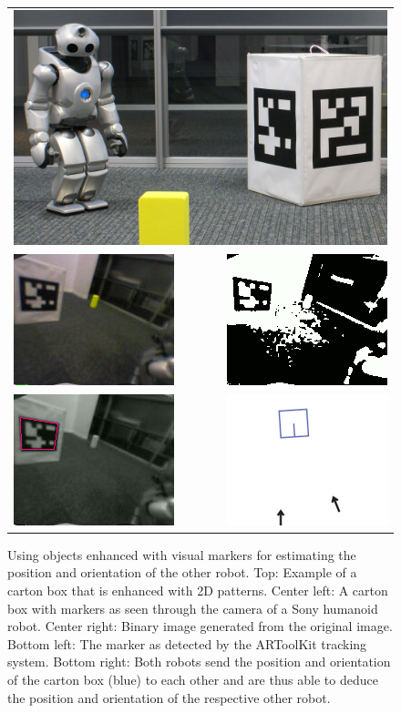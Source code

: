 \begin{figure}[t]
  \begin{tabular}{lr}
    \multicolumn{2}{l}{
      \includegraphics[width=0.5\columnwidth]{figures/artoolkit-0}\vspace{2mm}} \\
    \includegraphics[width=0.23\columnwidth]{figures/artoolkit-1} & 
    \includegraphics[width=0.23\columnwidth]{figures/artoolkit-2}\vspace{2mm}\\
    \includegraphics[width=0.23\columnwidth]{figures/artoolkit-3} & 
    \includegraphics[width=0.23\columnwidth]{figures/artoolkit-4}\\
  \end{tabular}
  \caption{Using objects enhanced with visual markers for estimating
    the position and orientation of the other robot. Top: Example of a
    carton box that is enhanced with 2D patterns. Center left: A
    carton box with markers as seen through the camera of a Sony
    humanoid robot. Center right: Binary image generated from the
    original image.  Bottom left: The marker as detected by the
    ARToolKit tracking system. Bottom right: Both robots send the
    position and orientation of the carton box (blue) to each other
    and are thus able to deduce the position and orientation of the
    respective other robot. }
  \label{f:artoolkit}
\end{figure}

